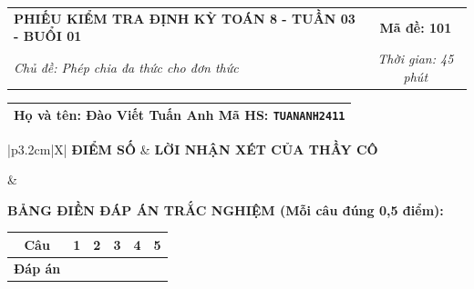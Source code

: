\documentclass[12pt,a4paper]{article}
\begin{document}
\pagestyle{empty}



\noindent
\begin{tabularx}{\linewidth}{|X|c|}
\hline
\textbf{PHIẾU KIỂM TRA ĐỊNH KỲ TOÁN 8 - TUẦN 03 - BUỔI 01} & \textbf{Mã đề: 101} \\
\textit{Chủ đề: Phép chia đa thức cho đơn thức} & \textit{Thời gian: 45 phút} \\
\hline
\end{tabularx}

\vspace{1mm}

\noindent
\begin{tabularx}{\linewidth}{|X|}
\hline
\rule[-2mm]{0pt}{7.5mm}\textbf{Họ và tên:} \textbf{\large Đào Viết Tuấn Anh} \hfill \textbf{Mã HS:} \texttt{TUANANH2411} \quad \\
\hline
\end{tabularx}

\vspace{1mm}

\noindent
\begin{tabularx}{\linewidth}{|p{3.2cm}|X|}
\hline
\centering\textbf{ĐIỂM SỐ} & \centering\textbf{LỜI NHẬN XÉT CỦA THẦY CÔ} \tabularnewline
\hline
\rule{0pt}{1.3cm} & \tabularnewline
\hline
\end{tabularx}

\vspace{1.2mm}

\noindent\textbf{BẢNG ĐIỀN ĐÁP ÁN TRẮC NGHIỆM (Mỗi câu đúng 0,5 điểm):}
\vspace{0.8mm}

\noindent
\renewcommand{\arraystretch}{1.35}
\begin{tabularx}{\linewidth}{|c|*{5}{>{\centering\arraybackslash}X|}}
\hline
\textbf{Câu} & \textbf{1} & \textbf{2} & \textbf{3} & \textbf{4} & \textbf{5} \\
\hline
\textbf{Đáp án} & & & & & \\
\hline
\end{tabularx}
\renewcommand{\arraystretch}{1.0}

\vspace{1.5mm}
\end{document}
